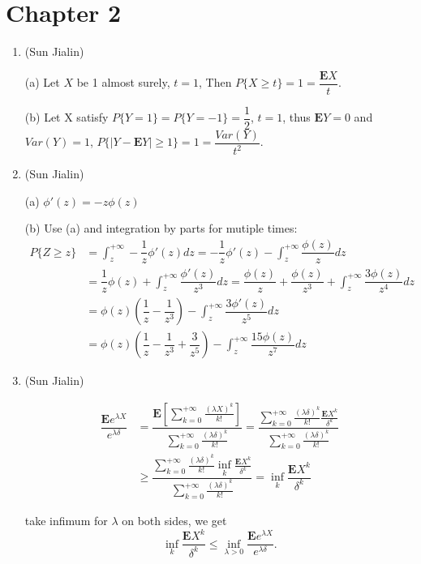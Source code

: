 \section{Chapter 2}
\begin{enumerate}
    \item
    (Sun Jialin)
    
    (a) Let $ X $ be 1 almost surely, $ t=1 $, Then $ P\{X \geq t\} = 1 = \dfrac{\bm{E}X}{t} $.
	
	(b) Let X satisfy $ P\{Y=1\}=P\{Y=-1\}= \dfrac{1}{2} $, $ t=1 $, thus $ \bm{E}Y=0 $ and $ Var(Y)=1 $, $ P\{|Y-\bm{E}Y|\geq 1 \}=1=\dfrac{Var(Y)}{t^{2}} $.
	
	\item
	(Sun Jialin)
	
	(a) $ \phi'(z) = -z\phi(z) $
	
	(b) Use (a) and integration by parts for mutiple times:
	\[\begin{split}
	P\{Z \geq z\}&=\int_{z}^{+\infty}-\dfrac{1}{z}\phi'(z)dz=-\dfrac{1}{z}\phi'(z)-\int_{z}^{+\infty} \dfrac{\phi(z)}{z}dz\\&=\dfrac{1}{z}\phi(z)+\int_{z}^{+\infty}\dfrac{\phi'(z)}{z^{3}}dz= \dfrac{\phi(z)}{z}+\dfrac{\phi(z)}{z^{3}}+\int_{z}^{+\infty}\dfrac{3\phi(z)}{z^{4}}dz\\&=\phi(z)(\dfrac{1}{z}-\dfrac{1}{z^{3}})-\int_{z}^{+\infty}\dfrac{3\phi'(z)}{z^{5}}dz\\&=\phi(z)(\dfrac{1}{z}-\dfrac{1}{z^{3}}+\dfrac{3}{z^{5}})-\int_{z}^{+\infty}\dfrac{15\phi(z)}{z^{7}}dz
	\end{split}\]
	
	\item
	(Sun Jialin)
	
	\[\begin{split}
	\dfrac{\bm{E}e^{\lambda X}}{e^{\lambda \delta}} &= \dfrac{\bm{E}[\sum_{k=0}^{+\infty}\frac{(\lambda X)^{k}}{k!}]}{\sum_{k=0}^{+\infty}\frac{(\lambda \delta)^{k}}{k!}} = \dfrac{\sum_{k=0}^{+\infty}\frac{(\lambda \delta)^{k}}{k!}\frac{\bm{E}X^{k}}{\delta^{k}}}{\sum_{k=0}^{+\infty}\frac{(\lambda \delta)^{k}}{k!}}\\& \geq
	\dfrac{\sum_{k=0}^{+\infty}\frac{(\lambda \delta)^{k}}{k!}\inf \limits_{k}\frac{\bm{E}X^{k}}{\delta^{k}}}{\sum_{k=0}^{+\infty}\frac{(\lambda \delta)^{k}}{k!}}=\inf \limits_{k}\dfrac{\bm{E}X^{k}}{\delta^{k}}
	\end{split}\]
	
	take infimum for $ \lambda $ on both sides, we get\[ \inf \limits_{k}\dfrac{\bm{E}X^{k}}{\delta^{k}} \leq \inf \limits_{\lambda>0} \dfrac{\bm{E}e^{\lambda X}}{e^{\lambda \delta}}. \]
	

\end{enumerate}
